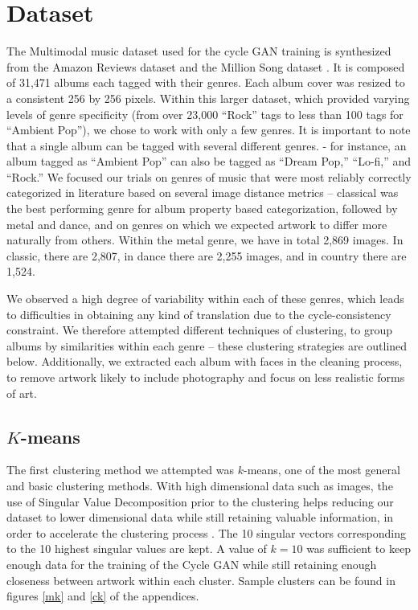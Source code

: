 \documentclass{article}
\begin{document}
\section{Dataset}

The Multimodal music dataset used for the cycle GAN training is synthesized from the Amazon Reviews dataset and the Million Song dataset \cite{Koenig}. It is composed of 31,471 albums each tagged with their genres. Each album cover was resized to a consistent 256 by 256 pixels. Within this larger dataset, which provided varying levels of genre specificity (from over 23,000 “Rock” tags to less than 100 tags for “Ambient Pop”), we chose to work with only a few genres. It is important to note that a single album can be tagged with several different genres. - for instance, an album tagged as “Ambient Pop” can also be tagged as “Dream Pop,” “Lo-fi,” and “Rock.” We focused our trials on genres of music that were most reliably correctly categorized in literature \cite{5696720} based on several image distance metrics – classical was the best performing genre for album property based categorization, followed by metal and dance, and on genres on which we expected artwork to differ more naturally from others. Within the metal genre, we have in total 2,869 images. In classic, there are 2,807, in dance there are 2,255 images, and in country there are 1,524.
\par We observed a high degree of variability within each of these genres, which leads to difficulties in obtaining any kind of translation due to the cycle-consistency constraint. We therefore attempted different techniques of clustering, to group albums by similarities within each genre – these clustering strategies are outlined below. Additionally, we extracted each album with faces in the cleaning process, to remove artwork likely to include photography and focus on less realistic forms of art.

\subsection{$K$-means}

The first clustering method we attempted was $k$-means, one of the most general and basic clustering methods. With high dimensional data such as images, the use of Singular Value Decomposition prior to the clustering helps reducing our dataset to lower dimensional data while still retaining valuable information, in order to accelerate the clustering process \cite{cite-key}. The 10 singular vectors corresponding to the 10 highest singular values are kept. A value of $k=10$ was sufficient to keep enough data for the training of the Cycle GAN while still retaining enough closeness between artwork within each cluster. Sample clusters can be found in figures \ref{mk} and \ref{ck} of the appendices.
\end{document}
